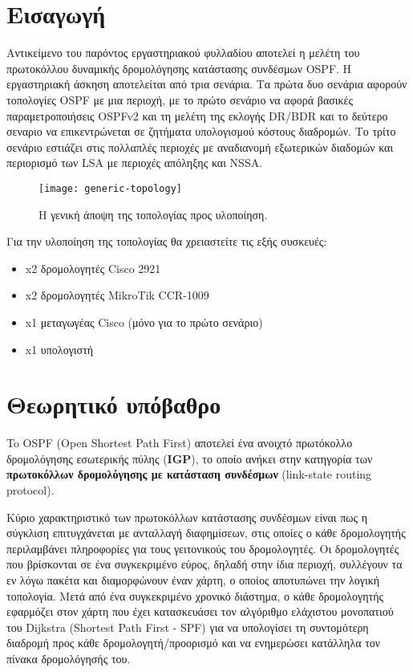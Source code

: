 \documentclass{EdipyLabs} %
\begin{document}
\Initialize

\section*{Εισαγωγή}
Αντικείμενο του παρόντος εργαστηριακού φυλλαδίου αποτελεί η μελέτη του πρωτοκόλλου δυναμικής δρομολόγησης κατάστασης συνδέσμων OSPF. Η εργαστηριακή άσκηση αποτελείται από τρια σενάρια. Τα πρώτα δυο σενάρια αφορούν τοπολογίες OSPF με μια περιοχή, με το πρώτο σενάριο να αφορά βασικές παραμετροποιήσεις OSPFv2 και τη μελέτη της εκλογής DR/BDR και το δεύτερο σεναριο να επικεντρώνεται σε ζητήματα υπολογισμού κόστους διαδρομών. Το τρίτο σενάριο εστιάζει στις πολλαπλές περιοχές με αναδιανομή εξωτερικών διαδομών και περιορισμό των LSA με περιοχές απόληξης και NSSA.

\begin{figure}[ht]
	\centering
	\texttt{[image: generic-topology]}
	\caption{H γενική άποψη της τοπολογίας προς υλοποίηση.}\label{fig:generic-topoloy}
\end{figure}

Για την υλοποίηση της τοπολογίας θα χρειαστείτε τις εξής συσκευές:

\begin{itemize}
	\item x2 δρομολογητές Cisco 2921
	\item x2 δρομολογητές MikroTik CCR-1009
	\item x1 μεταγωγέας Cisco (μόνο για το πρώτο σενάριο)
	\item x1 υπολογιστή
\end{itemize}

\section{Θεωρητικό υπόβαθρο}
To OSPF (Open Shortest Path First) αποτελεί ένα ανοιχτό πρωτόκολλο δρομολόγησης εσωτερικής πύλης (\textbf{IGP}), το οποίο ανήκει στην κατηγορία των \textbf{πρωτοκόλλων δρομολόγησης με κατάσταση συνδέσμων} (link-state routing protocol).

Κύριο χαρακτηριστικό των πρωτοκόλλων κατάστασης συνδέσμων είναι πως η σύγκλιση επιτυγχάνεται με ανταλλαγή διαφημίσεων, στις οποίες ο κάθε δρομολογητής περιλαμβάνει πληροφορίες για τους γειτονικούς του δρομολογητές. Οι δρομολογητές που βρίσκονται σε ένα συγκεκριμένο εύρος, δηλαδή στην ίδια περιοχή, συλλέγουν τα εν λόγω πακέτα και διαμορφώνουν έναν χάρτη, ο οποίος αποτυπώνει την λογική τοπολογία. Μετά από ένα συγκεκριμένο χρονικό διάστημα, ο κάθε δρομολογητής εφαρμόζει στον χάρτη που έχει κατασκευάσει τον αλγόριθμο ελάχιστου μονοπατιού του Dijkstra (Shortest Path First - SPF) για να υπολογίσει τη συντομότερη διαδρομή προς κάθε δρομολογητή/προορισμό και να ενημερώσει κατάλληλα τον πίνακα δρομολόγησής του. 
\end{document}
